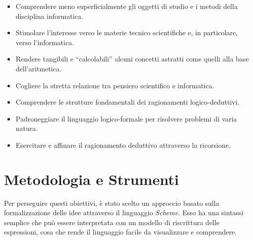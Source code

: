 \documentclass[withtimes]{easychair}
\begin{document}
\begin{itemize}
 \item Comprendere meno superficialmente gli oggetti di studio e i metodi   della disciplina informatica.%
  \item Stimolare l'interesse verso le materie tecnico scientifiche e, in   particolare, verso l'informatica.
  \item Rendere tangibili e ``calcolabili'' alcuni concetti astratti come quelli alla base dell'aritmetica.
  \item Cogliere la stretta relazione tra pensiero scientifico e informatica. %
 \item Comprendere le strutture fondamentali dei ragionamenti logico-deduttivi.
 \item Padroneggiare il linguaggio logico-formale per risolvere problemi di varia natura.
 \item Esercitare e affinare il ragionamento deduttivo attraverso la ricorsione.
\end{itemize}


\section{Metodologia e Strumenti}\label{metodologia-e-strumenti}

Per perseguire questi obiettivi, è stato scelto un approccio basato sulla formalizzazione delle idee attraverso il linguaggio \emph{Scheme}. Esso ha una sintassi semplice che può essere interpretata con un modello di riscrittura delle espressioni, cosa che rende il linguaggio facile da visualizzare e comprendere. %
\end{document}
